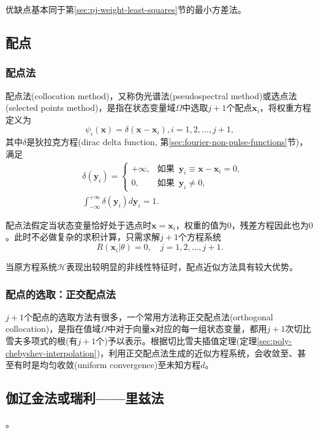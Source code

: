 优缺点基本同于第\ref{sec:pj-weight-least-squares}节的最小方差法。

\subsection{配点}
\label{sec:pj-weight-collocation}
\subsubsection{配点法}
\label{sec:pj-weight-collocation-method}
配点法(collocation method)，又称伪光谱法(pseudospectral method)或选点法(selected points method)，是指在状态变量域$\Omega$中选取$j+1$个配点$\bm{x}_i$，将权重方程定义为
\begin{equation*}
  \psi_i(\bm{x}) = \delta(\bm{x} - \bm{x}_i), i=1,2,\ldots,j+1,
\end{equation*}
其中$\delta$是狄拉克方程(dirac delta function, 第\ref{sec:fourier-non-pulse-functions}节)，满足
\begin{equation*}
  \begin{split}
    &\delta(\bm{y}_i) = \begin{cases}
    +\infty, &\text{如果 }\, \bm{y}_i \equiv \bm{x} - \bm{x}_i =0,\\
     0, &\text{如果 }\, \bm{y}_i \neq 0,
    \end{cases} \\
    &\int_{-\infty}^{+\infty} \delta(\bm{y}_i) d \bm{y}_i
 = 1.
  \end{split}
\end{equation*}

配点法假定当状态变量恰好处于选点时$\bm{x} = \bm{x}_i$，权重的值为$0$，残差方程因此也为$0$。此时不必做复杂的求积计算，只需求解$j+1$个方程系统
\begin{equation*}
  R\left( \bm{x}_i | \theta \right) =0, \quad j=1,2,\ldots,j+1.
\end{equation*}

当原方程系统$\mathcal{H}$表现出较明显的非线性特征时，配点近似方法具有较大优势。

\subsubsection{配点的选取：正交配点法}
\label{sec:pj-weight-collocation-orthogonal}

$j+1$个配点的选取方法有很多，一个常用方法称正交配点法(orthogonal collocation)，是指在值域$\Omega$中对于向量$\bm{x}$对应的每一组状态变量，都用$j+1$次切比雪夫多项式的根(有$j+1$个)予以表示。根据切比雪夫插值定理(定理\ref{sec:poly-chebyshev-interpolation})，利用正交配点法生成的近似方程系统，会收敛至、甚至有时是均匀收敛(uniform convergence)至未知方程$d$。

\subsection{伽辽金法或瑞利——里兹法}
\label{sec:pj-weight-galerkin}
。

